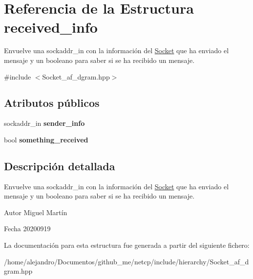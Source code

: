 \hypertarget{structreceived__info}{}\section{Referencia de la Estructura received\+\_\+info}
\label{structreceived__info}


Envuelve una sockaddr\+\_\+in con la información del \hyperlink{classSocket}{Socket} que ha enviado el mensaje y un booleano para saber si se ha recibido un mensaje.  




{\ttfamily \#include $<$Socket\+\_\+af\+\_\+dgram.\+hpp$>$}

\subsection*{Atributos públicos}
\begin{DoxyCompactItemize}
\item 
\mbox{\label{structreceived__info_aab4b72269198ea625744de39aad80ea5}} 
sockaddr\+\_\+in {\bfseries sender\+\_\+info}
\item 
\mbox{\label{structreceived__info_a7bedef8fd0ed79462fc64fcc69c774f8}} 
bool {\bfseries something\+\_\+received}
\end{DoxyCompactItemize}


\subsection{Descripción detallada}
Envuelve una sockaddr\+\_\+in con la información del \hyperlink{classSocket}{Socket} que ha enviado el mensaje y un booleano para saber si se ha recibido un mensaje. 

\begin{DoxyAuthor}{Autor}
Miguel Martín 
\end{DoxyAuthor}
\begin{DoxyDate}{Fecha}
20200919 
\end{DoxyDate}


La documentación para esta estructura fue generada a partir del siguiente fichero\+:\begin{DoxyCompactItemize}
\item 
/home/alejandro/\+Documentos/github\+\_\+me/netcp/include/hierarchy/Socket\+\_\+af\+\_\+dgram.\+hpp\end{DoxyCompactItemize}
